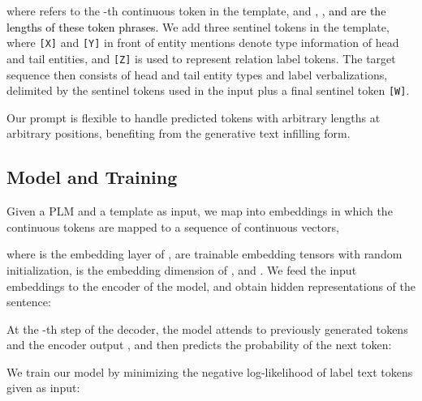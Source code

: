 \documentclass[11pt]{article}
\begin{document}
where  refers to the -{th} continuous token in the template, and \textcolor{black}{, , and  are the lengths of these token phrases.} We add three sentinel tokens in the template, where \texttt{[X]} and \texttt{[Y]} in front of entity mentions denote type information of head and tail entities, and \texttt{[Z]} is used to represent relation label tokens. The target sequence then consists of head and tail entity types and label verbalizations, delimited by the sentinel tokens used in the input plus a final sentinel token \texttt{[W]}.


Our prompt is flexible to handle predicted tokens with arbitrary lengths at arbitrary positions, benefiting from the generative text infilling form.
\begin{comment}
For example, we convert the example given in Section~\ref{4.1} to :

\begin{small}
	
\end{small}

The target sequence will be  ``\texttt{[X]}, \textit{organization}, \texttt{[Y]}, \textit{person}, \texttt{[Z]}, \textit{top}, \textit{members}, \textit{or}, \textit{employees}, \texttt{[W]}''.
\end{comment}

\subsection{Model and Training}\label{4.3}


Given a PLM  and a template  as input, we map  into embeddings in which the continuous tokens are mapped to a sequence of continuous vectors,

where  is the embedding layer of ,  are trainable embedding tensors with random initialization,  is the embedding dimension of , and . We feed the input embeddings to the encoder of the model, and obtain hidden representations  of the sentence:


At the -th step of the decoder, the model attends to previously generated tokens  and the encoder output , and then predicts the probability of the next token:


We train our model by minimizing the negative log-likelihood of label
text  tokens given  as input:
\end{document}
